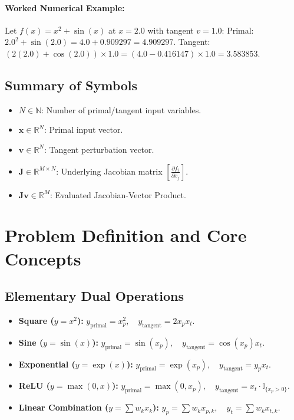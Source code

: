 \documentclass[11pt]{article}
\begin{document}
\paragraph{Worked Numerical Example:}
Let $f(x) = x^2 + \sin(x)$ at $x = 2.0$ with tangent $v = 1.0$:
Primal: $2.0^2 + \sin(2.0) = 4.0 + 0.909297 = 4.909297$.
Tangent: $(2(2.0) + \cos(2.0)) \times 1.0 = (4.0 - 0.416147) \times 1.0 = 3.583853$.

\subsection{Summary of Symbols}
\begin{itemize}
    \item $N \in \mathbb{N}$: Number of primal/tangent input variables.
    \item $\mathbf{x} \in \mathbb{R}^N$: Primal input vector.
    \item $\mathbf{v} \in \mathbb{R}^N$: Tangent perturbation vector.
    \item $\mathbf{J} \in \mathbb{R}^{M \times N}$: Underlying Jacobian matrix $\left[\frac{\partial f_i}{\partial x_j}\right]$.
    \item $\mathbf{J}\mathbf{v} \in \mathbb{R}^M$: Evaluated Jacobian-Vector Product.
\end{itemize}

\section{Problem Definition and Core Concepts}
\label{sec:problem_definition}

\subsection{Elementary Dual Operations}
\begin{itemize}
    \item \textbf{Square ($y = x^2$):} $y_{\mathrm{primal}} = x_p^2, \quad y_{\mathrm{tangent}} = 2 x_p x_t$.
    \item \textbf{Sine ($y = \sin(x)$):} $y_{\mathrm{primal}} = \sin(x_p), \quad y_{\mathrm{tangent}} = \cos(x_p) x_t$.
    \item \textbf{Exponential ($y = \exp(x)$):} $y_{\mathrm{primal}} = \exp(x_p), \quad y_{\mathrm{tangent}} = y_p x_t$.
    \item \textbf{ReLU ($y = \max(0, x)$):} $y_{\mathrm{primal}} = \max(0, x_p), \quad y_{\mathrm{tangent}} = x_t \cdot \mathbb{I}_{\{x_p > 0\}}$.
    \item \textbf{Linear Combination ($y = \sum w_k x_k$):} $y_p = \sum w_k x_{p, k}, \quad y_t = \sum w_k x_{t, k}$.
\end{itemize}
\end{document}
